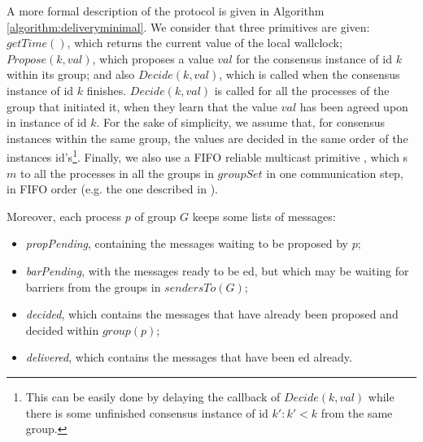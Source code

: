\documentclass[times, 10pt]{article}
\begin{document}
A more formal description of the protocol is given in Algorithm \ref{algorithm:deliveryminimal}. We consider that three primitives are given: $getTime()$, which returns the current value of the local wallclock; $Propose(k, val)$, which proposes a value $val$ for the consensus instance of id $k$ within its group; and also $Decide(k, val)$, which is called when the consensus instance of id $k$ finishes. $Decide(k, val)$ is called for all the processes of the group that initiated it, when they learn that the value $val$ has been agreed upon in instance of id $k$. For the sake of simplicity, we assume that, for consensus instances within the same group, the values are decided in the same order of the instances id's\footnote{This can be easily done by delaying the callback of $Decide(k, val)$ while there is some unfinished consensus instance of id $k': k' < k$ from the same group.}. Finally, we also use a FIFO reliable multicast primitive , which \rmd{}s $m$ to all the processes in all the groups in $groupSet$ in one communication step, in FIFO order (e.g. the one described in \cite{ufrmcast1delta}).

Moreover, each process $p$ of group $G$ keeps some lists of messages:
\begin{itemize}
  \item \textit{propPending}, containing the messages waiting to be proposed by $p$;
  \item \textit{barPending}, with the messages ready to be \cons{}ed, but which may be waiting for barriers from the groups in $sendersTo(G)$;
  \item \textit{decided}, which contains the messages that have already been proposed and decided within $group(p)$;
  \item \textit{delivered}, which contains the messages that have been \cons{}ed already.
\end{itemize} 

\end{document}
